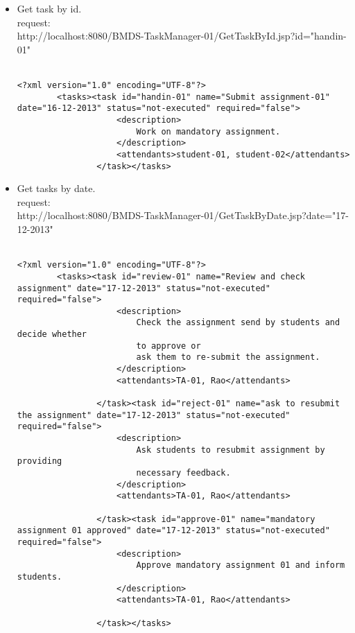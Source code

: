 \begin{itemize}
		\item
		Get task by id.\\	
		request:\\	
		http://localhost:8080/BMDS-TaskManager-01/GetTaskById.jsp?id="handin-01"\\\\
		
		\begin{lstlisting}[caption=response:]
		<?xml version="1.0" encoding="UTF-8"?>
		<tasks><task id="handin-01" name="Submit assignment-01" date="16-12-2013" status="not-executed" required="false">
					<description>
						Work on mandatory assignment.
					</description>
					<attendants>student-01, student-02</attendants>
				</task></tasks>
		\end{lstlisting}
		
		
		\item
		Get tasks by date.\\
		request:\\
		http://localhost:8080/BMDS-TaskManager-01/GetTaskByDate.jsp?date="17-12-2013"\\\\
		
		\begin{lstlisting}[caption=response:]
		<?xml version="1.0" encoding="UTF-8"?>
		<tasks><task id="review-01" name="Review and check assignment" date="17-12-2013" status="not-executed" required="false">
					<description>
						Check the assignment send by students and decide whether
						to approve or
						ask them to re-submit the assignment.
					</description>
					<attendants>TA-01, Rao</attendants>
		
				</task><task id="reject-01" name="ask to resubmit the assignment" date="17-12-2013" status="not-executed" required="false">
					<description>
						Ask students to resubmit assignment by providing
						necessary feedback.
					</description>
					<attendants>TA-01, Rao</attendants>
		
				</task><task id="approve-01" name="mandatory assignment 01 approved" date="17-12-2013" status="not-executed" required="false">
					<description>
						Approve mandatory assignment 01 and inform students.
					</description>
					<attendants>TA-01, Rao</attendants>
		
				</task></tasks>
		\end{lstlisting}
		\end{itemize}
